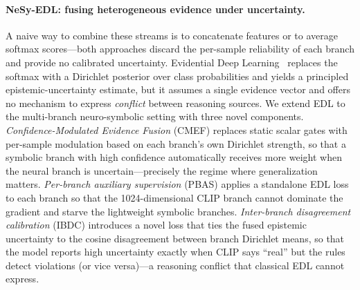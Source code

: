 \documentclass{article}
\begin{document}
\paragraph{NeSy-EDL: fusing heterogeneous evidence under uncertainty.}
A naive way to combine these streams is to concatenate features or to average softmax scores---both approaches discard the per-sample reliability of each branch and provide no calibrated uncertainty. Evidential Deep Learning~\citep{sensoy2018evidential} replaces the softmax with a Dirichlet posterior over class probabilities and yields a principled epistemic-uncertainty estimate, but it assumes a single evidence vector and offers no mechanism to express \emph{conflict} between reasoning sources. We extend EDL to the multi-branch neuro-symbolic setting with three novel components. \emph{Confidence-Modulated Evidence Fusion} (CMEF) replaces static scalar gates with per-sample modulation based on each branch's own Dirichlet strength, so that a symbolic branch with high confidence automatically receives more weight when the neural branch is uncertain---precisely the regime where generalization matters. \emph{Per-branch auxiliary supervision} (PBAS) applies a standalone EDL loss to each branch so that the 1024-dimensional CLIP branch cannot dominate the gradient and starve the lightweight symbolic branches. \emph{Inter-branch disagreement calibration} (IBDC) introduces a novel loss that ties the fused epistemic uncertainty to the cosine disagreement between branch Dirichlet means, so that the model reports high uncertainty exactly when CLIP says ``real'' but the rules detect violations (or vice versa)---a reasoning conflict that classical EDL cannot express.
\end{document}
